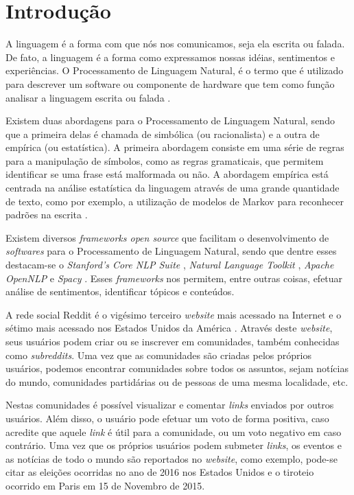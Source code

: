 \chapter{Introdução}
\label{chap:introducao}
A linguagem é a forma com que nós nos comunicamos, seja ela escrita ou
falada. De fato, a linguagem é a forma como
expressamos nossas idéias, sentimentos e experiências. O Processamento de
Linguagem Natural, é o termo que é utilizado para descrever um software ou
componente de hardware que tem como função analisar a linguagem escrita ou falada
\cite{jacksonmoulinier2007}.

Existem duas abordagens para o Processamento de Linguagem Natural, sendo que a
primeira delas é chamada de simbólica (ou racionalista) e a outra de empírica
(ou estatística).
A primeira abordagem consiste em uma série de regras para a manipulação de
símbolos, como as regras gramaticais, que permitem identificar se uma frase está
malformada ou não. A abordagem empírica está centrada na análise estatística da
linguagem através de uma grande quantidade de texto, como por exemplo, a
utilização de modelos de Markov para reconhecer padrões na escrita \cite{jacksonmoulinier2007}.

Existem diversos \textit{frameworks open source} que facilitam o desenvolvimento
de \textit{softwares} para o Processamento de Linguagem Natural, sendo que
dentre esses destacam-se o \textit{Stanford's Core NLP Suite} \cite{corenlp},
\textit{Natural Language Toolkit} \cite{nltk}, \textit{Apache OpenNLP} \cite{opennlp} e \textit{Spacy}
\cite{spacy}.
Esses \textit{frameworks} nos permitem, entre outras coisas, efetuar análise de
sentimentos, identificar tópicos e conteúdos.

A rede social Reddit é o vigésimo terceiro \textit{website} mais acessado na
Internet e o sétimo mais acessado nos Estados Unidos da América \cite{alexa}.
Através deste \textit{website}, seus usuários podem criar ou se inscrever em
comunidades, também conhecidas como \textit{subreddits}.
Uma vez que as comunidades são criadas pelos próprios usuários, podemos encontrar
comunidades sobre todos os assuntos, sejam notícias do mundo, comunidades
partidárias ou de pessoas de uma mesma localidade, etc.

Nestas comunidades é possível visualizar e comentar \textit{links} enviados por
outros usuários.
Além disso, o usuário pode efetuar um voto de forma positiva, caso acredite que
aquele \textit{link} é útil para a comunidade, ou um voto negativo em caso
contrário.
Uma vez que os próprios usuários podem submeter \textit{links}, os eventos e as
notícias de todo o mundo são reportados no \textit{website}, como exemplo,
pode-se citar as eleições ocorridas no ano de 2016 nos Estados Unidos e o
tiroteio ocorrido em Paris em 15 de Novembro de 2015.

